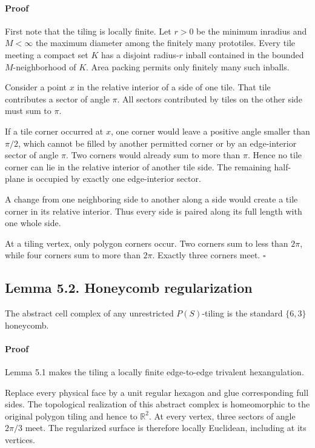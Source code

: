 \documentclass[11pt]{article}
\begin{document}
\paragraph{Proof}

First note that the tiling is locally finite. Let \(r>0\) be the minimum
inradius and \(M<\infty\) the maximum diameter among the finitely many
prototiles. Every tile meeting a compact set \(K\) has a disjoint
radius-\(r\) inball contained in the bounded \(M\)-neighborhood of \(K\).
Area packing permits only finitely many such inballs.

Consider a point \(x\) in the relative interior of a side of one tile. That
tile contributes a sector of angle \(\pi\). All sectors contributed by tiles
on the other side must sum to \(\pi\).

If a tile corner occurred at \(x\), one corner would leave a positive angle
smaller than \(\pi/2\), which cannot be filled by another permitted corner
or by an edge-interior sector of angle \(\pi\). Two corners would already
sum to more than \(\pi\). Hence no tile corner can lie in the relative
interior of another tile side. The remaining half-plane is occupied by
exactly one edge-interior sector.

A change from one neighboring side to another along a side would create a
tile corner in its relative interior. Thus every side is paired along its
full length with one whole side.

At a tiling vertex, only polygon corners occur. Two corners sum to less than
\(2\pi\), while four corners sum to more than \(2\pi\). Exactly three
corners meet. \(\square\)

\subsection*{Lemma 5.2. Honeycomb regularization}

The abstract cell complex of any unrestricted \(P(S)\)-tiling is the
standard \(\{6,3\}\) honeycomb.

\paragraph{Proof}

Lemma 5.1 makes the tiling a locally finite edge-to-edge trivalent
hexangulation.

Replace every physical face by a unit regular hexagon and glue corresponding
full sides. The topological realization of this abstract complex is
homeomorphic to the original polygon tiling and hence to \(\mathbb R^2\).
At every vertex, three sectors of angle \(2\pi/3\) meet. The regularized
surface is therefore locally Euclidean, including at its vertices.
\end{document}
